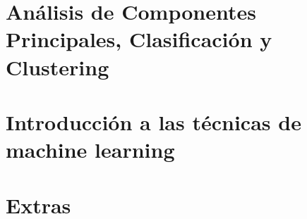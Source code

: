 \documentclass[]{book}
\begin{document}
\chapter{Análisis de Componentes Principales, Clasificación y
Clustering}\label{analisis-de-componentes-principales-clasificacion-y-clustering}

\chapter{Introducción a las técnicas de machine
learning}\label{introduccion-a-las-tecnicas-de-machine-learning}

\chapter{Extras}\label{extras}


\end{document}
